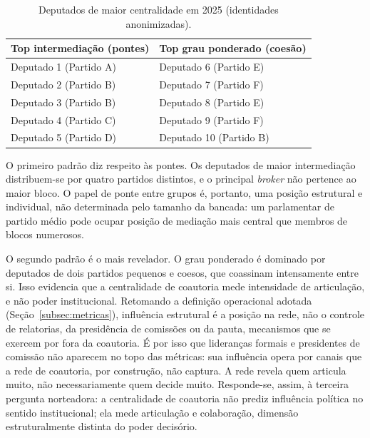 \documentclass[
      12pt,
      a4paper,
      openright,
      oneside,
      chapter=TITLE,
      section=TITLE,
      english,
      french,
      spanish,
      brazilian
    ]{abntex2}
\begin{document}
    \begin{table}[H]
    \centering
    \caption{Deputados de maior centralidade em 2025 (identidades anonimizadas).}
    \label{tab:top_deputados}
    \begin{tabular}{ll}
    \toprule
    \textbf{Top intermediação (pontes)} & \textbf{Top grau ponderado (coesão)} \\
    \midrule
    Deputado 1 (Partido A) & Deputado 6 (Partido E)  \\
    Deputado 2 (Partido B) & Deputado 7 (Partido F)  \\
    Deputado 3 (Partido B) & Deputado 8 (Partido E)  \\
    Deputado 4 (Partido C) & Deputado 9 (Partido F)  \\
    Deputado 5 (Partido D) & Deputado 10 (Partido B) \\
    \bottomrule
    \end{tabular}
    \end{table}
    
    O primeiro padrão diz respeito às pontes. Os deputados de maior intermediação distribuem-se por quatro partidos distintos, e o principal \textit{broker} não pertence ao maior bloco. O papel de ponte entre grupos é, portanto, uma posição estrutural e individual, não determinada pelo tamanho da bancada: um parlamentar de partido médio pode ocupar posição de mediação mais central que membros de blocos numerosos.
    
    O segundo padrão é o mais revelador. O grau ponderado é dominado por deputados de dois partidos pequenos e coesos, que coassinam intensamente entre si. Isso evidencia que a centralidade de coautoria mede intensidade de articulação, e não poder institucional. Retomando a definição operacional adotada (Seção~\ref{subsec:metricas}), influência estrutural é a posição na rede, não o controle de relatorias, da presidência de comissões ou da pauta, mecanismos que se exercem por fora da coautoria. É por isso que lideranças formais e presidentes de comissão não aparecem no topo das métricas: sua influência opera por canais que a rede de coautoria, por construção, não captura. A rede revela quem articula muito, não necessariamente quem decide muito. Responde-se, assim, à terceira pergunta norteadora: a centralidade de coautoria não prediz influência política no sentido institucional; ela mede articulação e colaboração, dimensão estruturalmente distinta do poder decisório.
    
\end{document}
